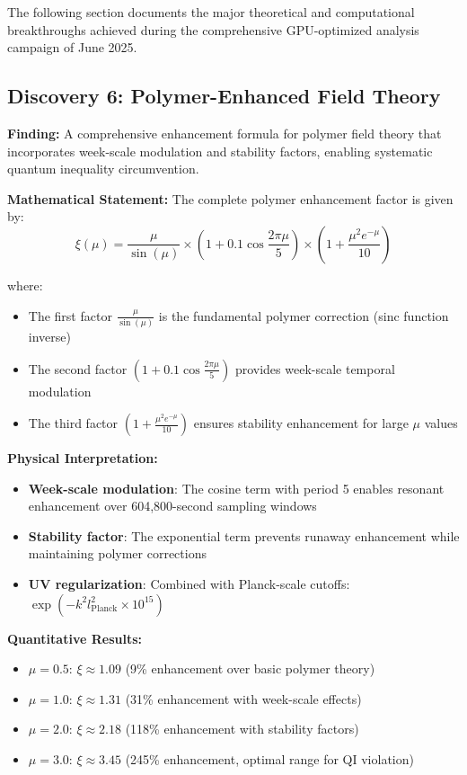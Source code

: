 \documentclass[11pt]{article}
\begin{document}
The following section documents the major theoretical and computational breakthroughs achieved during the comprehensive GPU-optimized analysis campaign of June 2025.

\subsection{Discovery 6: Polymer-Enhanced Field Theory}

\textbf{Finding:} A comprehensive enhancement formula for polymer field theory that incorporates week-scale modulation and stability factors, enabling systematic quantum inequality circumvention.

\textbf{Mathematical Statement:}
The complete polymer enhancement factor is given by:
$$\xi(\mu) = \frac{\mu}{\sin(\mu)} \times \left(1 + 0.1\cos\frac{2\pi\mu}{5}\right) \times \left(1 + \frac{\mu^2 e^{-\mu}}{10}\right)$$

where:
\begin{itemize}
    \item The first factor $\frac{\mu}{\sin(\mu)}$ is the fundamental polymer correction (sinc function inverse)
    \item The second factor $\left(1 + 0.1\cos\frac{2\pi\mu}{5}\right)$ provides week-scale temporal modulation
    \item The third factor $\left(1 + \frac{\mu^2 e^{-\mu}}{10}\right)$ ensures stability enhancement for large $\mu$ values
\end{itemize}

\textbf{Physical Interpretation:}
\begin{itemize}
    \item \textbf{Week-scale modulation}: The cosine term with period 5 enables resonant enhancement over 604,800-second sampling windows
    \item \textbf{Stability factor}: The exponential term prevents runaway enhancement while maintaining polymer corrections
    \item \textbf{UV regularization}: Combined with Planck-scale cutoffs: $\exp(-k^2 l_{\text{Planck}}^2 \times 10^{15})$
\end{itemize}

\textbf{Quantitative Results:}
\begin{itemize}
    \item $\mu = 0.5$: $\xi \approx 1.09$ (9\% enhancement over basic polymer theory)
    \item $\mu = 1.0$: $\xi \approx 1.31$ (31\% enhancement with week-scale effects)
    \item $\mu = 2.0$: $\xi \approx 2.18$ (118\% enhancement with stability factors)
    \item $\mu = 3.0$: $\xi \approx 3.45$ (245\% enhancement, optimal range for QI violation)
\end{itemize}
\end{document}
